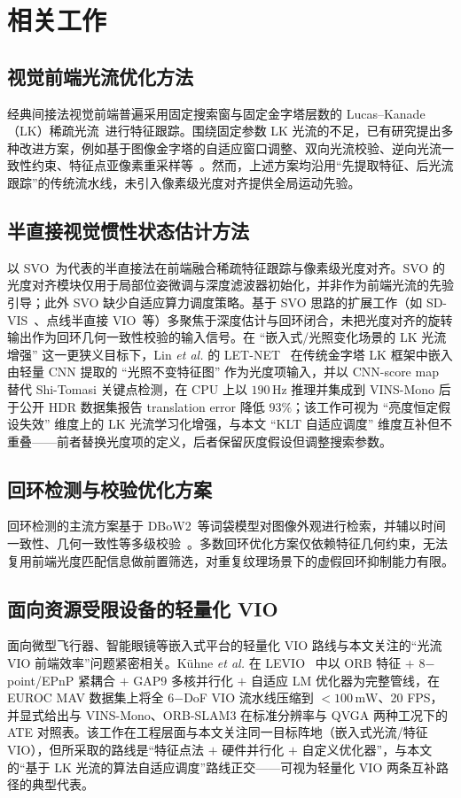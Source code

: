 \documentclass[letterpaper,journal]{IEEEtran}
\begin{document}
\section{相关工作}

\subsection{视觉前端光流优化方法}
经典间接法视觉前端普遍采用固定搜索窗与固定金字塔层数的 Lucas--Kanade（LK）稀疏光流~\cite{baker2004lucas}进行特征跟踪。围绕固定参数 LK 光流的不足，已有研究提出多种改进方案，例如基于图像金字塔的自适应窗口调整、双向光流校验、逆向光流一致性约束、特征点亚像素重采样等~\cite{shi1994goodfeatures}。然而，上述方案均沿用``先提取特征、后光流跟踪''的传统流水线，未引入像素级光度对齐提供全局运动先验。

\subsection{半直接视觉惯性状态估计方法}
以 SVO~\cite{forster2014svo,forster2017svo}为代表的半直接法在前端融合稀疏特征跟踪与像素级光度对齐。SVO 的光度对齐模块仅用于局部位姿微调与深度滤波器初始化，并非作为前端光流的先验引导；此外 SVO 缺少自适应算力调度策略。基于 SVO 思路的扩展工作（如 SD-VIS~\cite{liu2020sdvis}、点线半直接 VIO~\cite{gao2022sdplvio}等）多聚焦于深度估计与回环闭合，未把光度对齐的旋转输出作为回环几何一致性校验的输入信号。在 ``嵌入式/光照变化场景的 LK 光流增强'' 这一更狭义目标下，Lin \emph{et al.} 的 LET-NET~\cite{lin2024letnet} 在传统金字塔 LK 框架中嵌入由轻量 CNN 提取的 ``光照不变特征图'' 作为光度项输入，并以 CNN-score map 替代 Shi-Tomasi 关键点检测，在 CPU 上以 $190\,\mathrm{Hz}$ 推理并集成到 VINS-Mono 后于公开 HDR 数据集报告 translation error 降低 $93\%$；该工作可视为 ``亮度恒定假设失效'' 维度上的 LK 光流学习化增强，与本文 ``KLT 自适应调度'' 维度互补但不重叠——前者替换光度项的定义，后者保留灰度假设但调整搜索参数。

\subsection{回环检测与校验优化方案}
回环检测的主流方案基于 DBoW2~\cite{galvez2012bags}等词袋模型对图像外观进行检索，并辅以时间一致性、几何一致性等多级校验~\cite{mur2015orb,campos2021orb}。多数回环优化方案仅依赖特征几何约束，无法复用前端光度匹配信息做前置筛选，对重复纹理场景下的虚假回环抑制能力有限。

\subsection{面向资源受限设备的轻量化 VIO}
面向微型飞行器、智能眼镜等嵌入式平台的轻量化 VIO 路线与本文关注的``光流 VIO 前端效率''问题紧密相关。K\"uhne \emph{et al.} 在 LEVIO~\cite{kuhne2026levio} 中以 ORB 特征 $+$ 8$-$point/EPnP 紧耦合 $+$ GAP9 多核并行化 $+$ 自适应 LM 优化器为完整管线，在 EUROC MAV 数据集上将全 6$-$DoF VIO 流水线压缩到 $<\!100\,\mathrm{mW}$、20 FPS，并显式给出与 VINS-Mono、ORB-SLAM3 在标准分辨率与 QVGA 两种工况下的 ATE 对照表。该工作在工程层面与本文关注同一目标阵地（嵌入式光流/特征 VIO），但所采取的路线是``特征点法 $+$ 硬件并行化 $+$ 自定义优化器''，与本文的``基于 LK 光流的算法自适应调度''路线正交——可视为轻量化 VIO 两条互补路径的典型代表。
\end{document}
